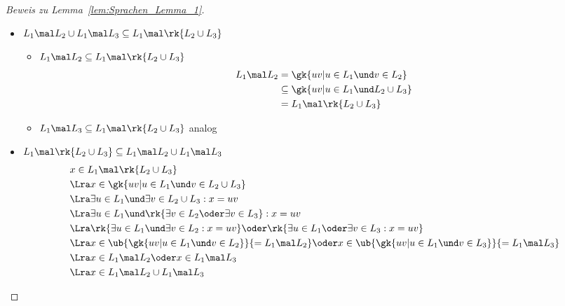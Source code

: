 \begin{proof}[Beweis zu Lemma~\vref{lem:Sprachen_Lemma_1}]~
\begin{itemize}
\item $L_1 \mal L_2 \cup L_1 \mal L_3 \subseteq L_1 \mal \rk{L_2 \cup L_3}$
	\begin{itemize}
	\item $L_1 \mal L_2 \subseteq L_1 \mal \rk{L_2 \cup L_3}$
		\begin{align*}
		L_1 \mal L_2 &= \gk{uv \vert u \in L_1 \und v \in L_2}\\
		&\subseteq \gk{uv \vert u \in L_1 \und L_2 \cup L_3}\\
		&= L_1 \mal \rk{L_2 \cup L_3}
		\end{align*}

	\item $L_1 \mal L_3 \subseteq L_1 \mal \rk{L_2 \cup L_3}$ analog
	\end{itemize}

\item $L_1 \mal \rk{L_2 \cup L_3} \subseteq L_1 \mal L_2 \cup L_1 \mal L_3$
	\begin{align*}
	&x \in L_1 \mal \rk{L_2 \cup L_3}\\
	&\Lra x \in \gk{uv | u \in L_1 \und v \in L_2 \cup L_3}\\
	&\Lra \exists u \in L_1 \und \exists v \in L_2 \cup L_3 : x = uv\\
	&\Lra \exists u \in L_1 \und \rk{\exists v \in L_2 \oder \exists v \in L_3} : x = uv\\
	&\Lra \rk{\exists u \in L_1 \und \exists v \in L_2 : x = uv} \oder \rk{\exists u \in L_1 \oder \exists v \in L_3 : x = uv}\\
	&\Lra x \in \ub{\gk{uv | u \in L_1 \und v \in L_2}}{=L_1 \mal L_2} \oder x \in \ub{\gk{uv \vert u \in L_1 \und v \in L_3}}{= L_1 \mal L_3}\\
	&\Lra x \in L_1 \mal L_2 \oder x \in L_1 \mal L_3\\
	&\Lra x \in L_1 \mal L_2 \cup L_1 \mal L_3
	\end{align*}
\end{itemize}
\end{proof}
